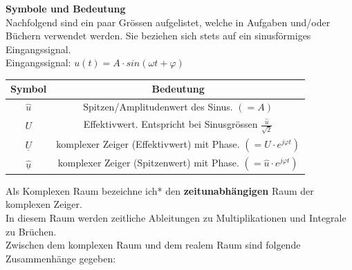 \vspace{1cm}
\textbf{Symbole und Bedeutung} \\
Nachfolgend sind ein paar Grössen aufgelistet, welche in Aufgaben und/oder Büchern verwendet werden. Sie beziehen sich stets auf ein sinusförmiges Eingangssignal. \\
 Eingangssignal: $ u(t) = A \cdot sin(\omega t + \varphi)$ \\
\begin{center}
\begin{tabular}{c|c}
 Symbol & Bedeutung \\
\hline
\hline
$\displaystyle \hat{u} $ &   Spitzen/Amplitudenwert des Sinus. $(= A)$ \\
\hline
$\displaystyle U$ & Effektivwert. Entspricht bei Sinusgrössen $\displaystyle  \frac{\hat{u}}{\sqrt{2}}$ \\
\hline
$\displaystyle \underline{U}$ & komplexer Zeiger (Effektivwert) mit Phase. $\displaystyle (= U \cdot e^{j\varphi t})$ \\
\hline
$\displaystyle \underline{\hat{u}}$ & komplexer Zeiger (Spitzenwert) mit Phase. $\displaystyle (= \hat{u} \cdot e^{j\varphi t})$ \\
\hline
\end{tabular}
\end{center}

\newpage


\beginip
Als Komplexen Raum bezeichne ich* den \textbf{zeitunabhängigen} Raum der komplexen Zeiger. \\
In diesem Raum werden zeitliche Ableitungen zu Multiplikationen und Integrale zu Brüchen. \\
Zwischen dem komplexen Raum und dem realem Raum sind folgende Zusammenhänge gegeben: \\

